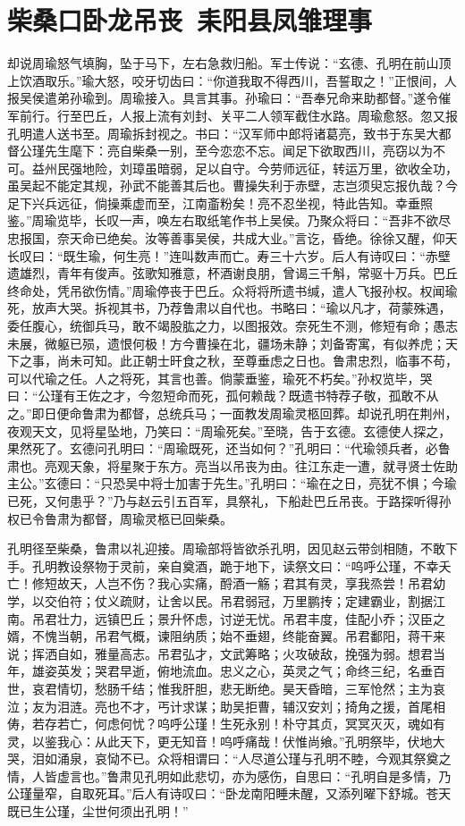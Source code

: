 \chapter{柴桑口卧龙吊丧~耒阳县凤雏理事}

却说周瑜怒气填胸，坠于马下，左右急救归船。军士传说：“玄德、孔明在前山顶上饮酒取乐。”瑜大怒，咬牙切齿曰：“你道我取不得西川，吾誓取之！”正恨间，人报吴侯遣弟孙瑜到。周瑜接入。具言其事。孙瑜曰：“吾奉兄命来助都督。”遂令催军前行。行至巴丘，人报上流有刘封、关平二人领军截住水路。周瑜愈怒。忽又报孔明遣人送书至。周瑜拆封视之。书曰：“汉军师中郎将诸葛亮，致书于东吴大都督公瑾先生麾下：亮自柴桑一别，至今恋恋不忘。闻足下欲取西川，亮窃以为不可。益州民强地险，刘璋虽暗弱，足以自守。今劳师远征，转运万里，欲收全功，虽吴起不能定其规，孙武不能善其后也。曹操失利于赤壁，志岂须臾忘报仇哉？今足下兴兵远征，倘操乘虚而至，江南齑粉矣！亮不忍坐视，特此告知。幸垂照鉴。”周瑜览毕，长叹一声，唤左右取纸笔作书上吴侯。乃聚众将曰：“吾非不欲尽忠报国，奈天命已绝矣。汝等善事吴侯，共成大业。”言讫，昏绝。徐徐又醒，仰天长叹曰：“既生瑜，何生亮！”连叫数声而亡。寿三十六岁。后人有诗叹曰：“赤壁遗雄烈，青年有俊声。弦歌知雅意，杯酒谢良朋，曾谒三千斛，常驱十万兵。巴丘终命处，凭吊欲伤情。”周瑜停丧于巴丘。众将将所遗书缄，遣人飞报孙权。权闻瑜死，放声大哭。拆视其书，乃荐鲁肃以自代也。书略曰：“瑜以凡才，荷蒙殊遇，委任腹心，统御兵马，敢不竭股肱之力，以图报效。奈死生不测，修短有命；愚志未展，微躯已殒，遗恨何极！方今曹操在北，疆场未静；刘备寄寓，有似养虎；天下之事，尚未可知。此正朝士旰食之秋，至尊垂虑之日也。鲁肃忠烈，临事不苟，可以代瑜之任。人之将死，其言也善。倘蒙垂鉴，瑜死不朽矣。”孙权览毕，哭曰：“公瑾有王佐之才，今忽短命而死，孤何赖哉？既遗书特荐子敬，孤敢不从之。”即日便命鲁肃为都督，总统兵马；一面教发周瑜灵柩回葬。却说孔明在荆州，夜观天文，见将星坠地，乃笑曰：“周瑜死矣。”至晓，告于玄德。玄德使人探之，果然死了。玄德问孔明曰：“周瑜既死，还当如何？”孔明曰：“代瑜领兵者，必鲁肃也。亮观天象，将星聚于东方。亮当以吊丧为由。往江东走一遭，就寻贤士佐助主公。”玄德曰：“只恐吴中将士加害于先生。”孔明曰：“瑜在之日，亮犹不惧；今瑜已死，又何患乎？”乃与赵云引五百军，具祭礼，下船赴巴丘吊丧。于路探听得孙权已令鲁肃为都督，周瑜灵柩已回柴桑。

孔明径至柴桑，鲁肃以礼迎接。周瑜部将皆欲杀孔明，因见赵云带剑相随，不敢下手。孔明教设祭物于灵前，亲自奠酒，跪于地下，读祭文曰：“呜呼公瑾，不幸夭亡！修短故天，人岂不伤？我心实痛，酹酒一觞；君其有灵，享我烝尝！吊君幼学，以交伯符；仗义疏财，让舍以民。吊君弱冠，万里鹏抟；定建霸业，割据江南。吊君壮力，远镇巴丘；景升怀虑，讨逆无忧。吊君丰度，佳配小乔；汉臣之婿，不愧当朝，吊君气概，谏阻纳质；始不垂翅，终能奋翼。吊君鄱阳，蒋干来说；挥洒自如，雅量高志。吊君弘才，文武筹略；火攻破敌，挽强为弱。想君当年，雄姿英发；哭君早逝，俯地流血。忠义之心，英灵之气；命终三纪，名垂百世，哀君情切，愁肠千结；惟我肝胆，悲无断绝。昊天昏暗，三军怆然；主为哀泣；友为泪涟。亮也不才，丐计求谋；助吴拒曹，辅汉安刘；掎角之援，首尾相俦，若存若亡，何虑何忧？呜呼公瑾！生死永别！朴守其贞，冥冥灭灭，魂如有灵，以鉴我心：从此天下，更无知音！呜呼痛哉！伏惟尚飨。”孔明祭毕，伏地大哭，泪如涌泉，哀恸不已。众将相谓曰：“人尽道公瑾与孔明不睦，今观其祭奠之情，人皆虚言也。”鲁肃见孔明如此悲切，亦为感伤，自思曰：“孔明自是多情，乃公瑾量窄，自取死耳。”后人有诗叹曰：“卧龙南阳睡未醒，又添列曜下舒城。苍天既已生公瑾，尘世何须出孔明！”

